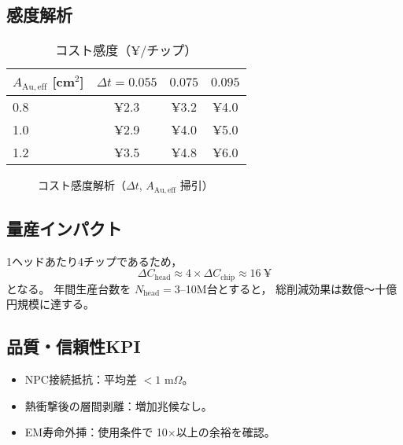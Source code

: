 \documentclass[conference]{IEEEtran}
\begin{document}
\subsection{感度解析}
\begin{table}[htbp]
  \centering
  \caption{コスト感度（¥/チップ）}
  \label{tab:cost-sense}
  \begin{tabular}{@{}lccc@{}}
    \toprule
    $A_{\mathrm{Au,eff}}$ [cm$^2$] & $\Delta t=0.055$ & $0.075$ & $0.095$ \\
    \midrule
    0.8 & ¥2.3 & ¥3.2 & ¥4.0 \\
    1.0 & ¥2.9 & ¥4.0 & ¥5.0 \\
    1.2 & ¥3.5 & ¥4.8 & ¥6.0 \\
    \bottomrule
  \end{tabular}
\end{table}

\begin{figure}[htbp]
  \centering
  \caption{コスト感度解析（$\Delta t$, $A_{\mathrm{Au,eff}}$ 掃引）}
  \label{fig:cost-sense}
\end{figure}

\subsection{量産インパクト}
1ヘッドあたり4チップであるため，
\[
 \Delta C_{\mathrm{head}} \approx 4 \times \Delta C_{\mathrm{chip}} \approx 16\ \text{¥}
\]
となる。  
年間生産台数を $N_{\mathrm{head}}=3$--10M台とすると，
総削減効果は数億〜十億円規模に達する。

\subsection{品質・信頼性KPI}
\begin{itemize}
  \item NPC接続抵抗：平均差 $<1$ m$\Omega$。
  \item 熱衝撃後の層間剥離：増加兆候なし。
  \item EM寿命外挿：使用条件で 10$\times$以上の余裕を確認。
\end{itemize}
\end{document}
